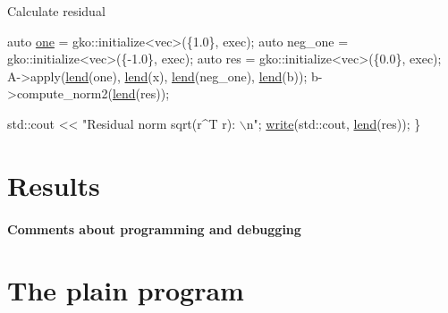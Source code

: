 Calculate residual


\begin{DoxyCode}
    \textcolor{keyword}{auto} \hyperlink{namespacegko_a0059e27f8f4bc348ff65c1e60caf47c8}{one} = gko::initialize<vec>(\{1.0\}, exec);
    \textcolor{keyword}{auto} neg\_one = gko::initialize<vec>(\{-1.0\}, exec);
    \textcolor{keyword}{auto} res = gko::initialize<vec>(\{0.0\}, exec);
    A->apply(\hyperlink{namespacegko_aa8cb4876b72e5e1036ea9575443c439b}{lend}(one), \hyperlink{namespacegko_aa8cb4876b72e5e1036ea9575443c439b}{lend}(x), \hyperlink{namespacegko_aa8cb4876b72e5e1036ea9575443c439b}{lend}(neg\_one), \hyperlink{namespacegko_aa8cb4876b72e5e1036ea9575443c439b}{lend}(b));
    b->compute\_norm2(\hyperlink{namespacegko_aa8cb4876b72e5e1036ea9575443c439b}{lend}(res));

    std::cout << \textcolor{stringliteral}{"Residual norm sqrt(r^T r): \(\backslash\)n"};
    \hyperlink{namespacegko_a859dc47a462721d83728d91ab7fa2148}{write}(std::cout, \hyperlink{namespacegko_aa8cb4876b72e5e1036ea9575443c439b}{lend}(res));
\}
\end{DoxyCode}
 \label{_Results}%
\section*{Results}

\label{_Commentsaboutprogramminganddebugging}%
\paragraph*{Comments about programming and debugging }

\label{_PlainProg}%
 \section*{The plain program}


